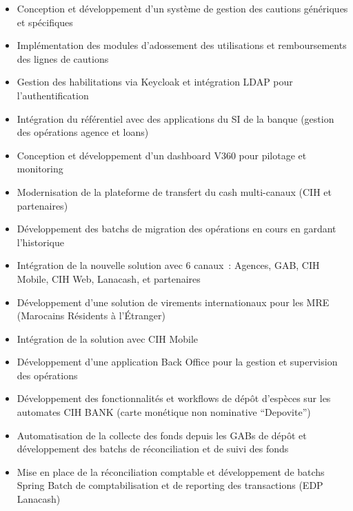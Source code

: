 \begin{itemize}
    \item Conception et développement d'un système de gestion des cautions génériques et spécifiques
    \item Implémentation des modules d'adossement des utilisations et remboursements des lignes de cautions
    \item Gestion des habilitations via Keycloak et intégration LDAP pour l'authentification
    \item Intégration du référentiel avec des applications du SI de la banque (gestion des opérations agence et loans)
    \item Conception et développement d'un dashboard V360 pour pilotage et monitoring
\end{itemize}

\begin{itemize}
    \item Modernisation de la plateforme de transfert du cash multi-canaux (CIH et partenaires)
    \item Développement des batchs de migration des opérations en cours en gardant l'historique
    \item Intégration de la nouvelle solution avec 6 canaux~: Agences, GAB, CIH Mobile, CIH Web, Lanacash, et partenaires
\end{itemize}

\begin{itemize}
    \item Développement d'une solution de virements internationaux pour les MRE (Marocains Résidents à l'Étranger)
    \item Intégration de la solution avec CIH Mobile
    \item Développement d'une application Back Office pour la gestion et supervision des opérations
\end{itemize}

\begin{itemize}
    \item Développement des fonctionnalités et workflows de dépôt d'espèces sur les automates CIH BANK (carte monétique non nominative ``Depovite'')
    \item Automatisation de la collecte des fonds depuis les GABs de dépôt et développement des batchs de réconciliation et de suivi des fonds
    \item Mise en place de la réconciliation comptable et développement de batchs Spring Batch de comptabilisation et de reporting des transactions (EDP Lanacash)
\end{itemize}

